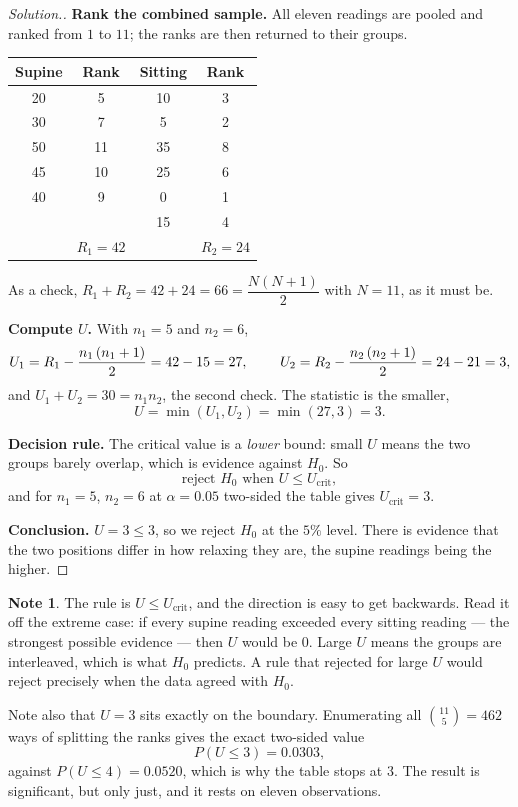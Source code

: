 \documentclass[11pt,a4paper]{article}
\theoremstyle{definition}
\newtheorem{note}[thm]{Note}
\newenvironment{solution}
  {\renewcommand{\qedsymbol}{}\begin{proof}[\textit{Solution}.]}
  {\end{proof}}
\begin{document}
\begin{solution}
\textbf{Rank the combined sample.} All eleven readings are pooled and ranked from
$1$ to $11$; the ranks are then returned to their groups.

\begin{table}[H]
\centering
\begin{tabular}{cccc}
Supine & Rank & Sitting & Rank\\
\hline 20&5&10&3\\
30&7&5&2\\
50&11&35&8\\
45&10&25&6\\
40&9&0&1\\
&&15&4\\
\hline &$R_1=42$&&$R_2=24$\\
\hline
\end{tabular}
\end{table}

As a check, $R_1+R_2=42+24=66=\dfrac{N(N+1)}{2}$ with $N=11$, as it must be.

\textbf{Compute $U$.} With $n_1=5$ and $n_2=6$,
$$U_1=R_1-\dfrac{n_1\left(n_1+1\right)}{2}=42-15=27,\hspace{0.8cm}
U_2=R_2-\dfrac{n_2\left(n_2+1\right)}{2}=24-21=3,$$
and $U_1+U_2=30=n_1n_2$, the second check. The statistic is the smaller,
$$U=\min\left(U_1,U_2\right)=\min(27,3)=3 .$$

\textbf{Decision rule.} The critical value is a \emph{lower} bound: small $U$ means
the two groups barely overlap, which is evidence against $H_0$. So
$$\text{reject } H_0 \text{ when } U\leq U_{\text{crit}} ,$$
and for $n_1=5$, $n_2=6$ at $\alpha=0.05$ two-sided the table gives
$U_{\text{crit}}=3$.

\textbf{Conclusion.} $U=3\leq 3$, so we reject $H_0$ at the $5\%$ level. There is
evidence that the two positions differ in how relaxing they are, the supine
readings being the higher.
\end{solution}

\begin{note}
The rule is $U\leq U_{\text{crit}}$, and the direction is easy to get backwards.
Read it off the extreme case: if every supine reading exceeded every sitting
reading --- the strongest possible evidence --- then $U$ would be $0$. Large $U$ means
the groups are interleaved, which is what $H_0$ predicts. A rule that rejected for
large $U$ would reject precisely when the data agreed with $H_0$.

Note also that $U=3$ sits exactly on the boundary. Enumerating all
$\binom{11}{5}=462$ ways of splitting the ranks gives the exact two-sided value
$$P(U\leq 3)=0.0303 ,$$
against $P(U\leq 4)=0.0520$, which is why the table stops at $3$. The result is
significant, but only just, and it rests on eleven observations.
\end{note}
\end{document}
